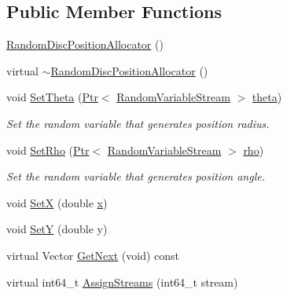 \subsection*{Public Member Functions}
\begin{DoxyCompactItemize}
\item 
\hyperlink{classns3_1_1RandomDiscPositionAllocator_a236e67ae9a3e2e771a5087231bb01035}{Random\+Disc\+Position\+Allocator} ()
\item 
virtual \hyperlink{classns3_1_1RandomDiscPositionAllocator_a5c9742134088f641b86c8ea86aff6dc5}{$\sim$\+Random\+Disc\+Position\+Allocator} ()
\item 
void \hyperlink{classns3_1_1RandomDiscPositionAllocator_a90cdec76769a1db38392203395ca27eb}{Set\+Theta} (\hyperlink{classns3_1_1Ptr}{Ptr}$<$ \hyperlink{classns3_1_1RandomVariableStream}{Random\+Variable\+Stream} $>$ \hyperlink{loss__ITU1411__NLOS__over__rooftop_8m_a68ce9834ce390774bce9c89b78d5bf79}{theta})
\begin{DoxyCompactList}\small\item\em Set the random variable that generates position radius. \end{DoxyCompactList}\item 
void \hyperlink{classns3_1_1RandomDiscPositionAllocator_a3e673dc2b0267c8afbdec8b3ca5c3574}{Set\+Rho} (\hyperlink{classns3_1_1Ptr}{Ptr}$<$ \hyperlink{classns3_1_1RandomVariableStream}{Random\+Variable\+Stream} $>$ \hyperlink{loss__ITU1411__NLOS__over__rooftop_8m_ab8ec92cc3ea8422c9349409bae98d2a0}{rho})
\begin{DoxyCompactList}\small\item\em Set the random variable that generates position angle. \end{DoxyCompactList}\item 
void \hyperlink{classns3_1_1RandomDiscPositionAllocator_a3a3830c0578de4c56f9f4881dd80d739}{SetX} (double \hyperlink{lte__link__budget__x2__handover__measures_8m_a9336ebf25087d91c818ee6e9ec29f8c1}{x})
\item 
void \hyperlink{classns3_1_1RandomDiscPositionAllocator_a43d10a780122333a845c466bba9f3cbe}{SetY} (double y)
\item 
virtual Vector \hyperlink{classns3_1_1RandomDiscPositionAllocator_a8ba9e3b7d20d1a1a71b376254ee40184}{Get\+Next} (void) const 
\item 
virtual int64\+\_\+t \hyperlink{classns3_1_1RandomDiscPositionAllocator_af4eacdd48512a967019ab64ee86f9366}{Assign\+Streams} (int64\+\_\+t stream)
\end{DoxyCompactItemize}

